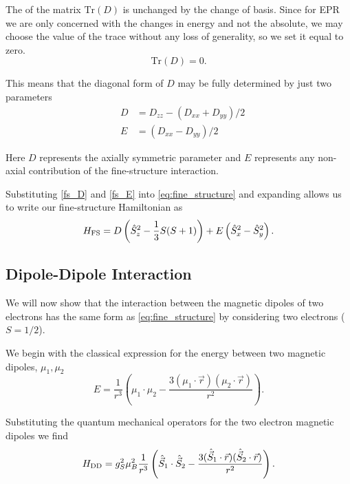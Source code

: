 The  of the matrix $\text{Tr}(D)$ is unchanged by the change of basis. Since for EPR we are only concerned with the changes in energy and not the absolute, we may choose the value of the trace without any loss of generality, so we set it equal to zero. 
\begin{equation}
    \text{Tr}(D) = 0. 
\end{equation}

This means that the diagonal form of $D$ may be fully determined by just two parameters 
\begin{eqnarray}
    &D &= D_{zz} - (D_{xx}+ D_{yy})/2 \label{fs_D}\\ 
    &E &= (D_{xx} - D_{yy})/2 \label{fs_E}
\end{eqnarray}

Here $D$ represents the axially symmetric parameter and $E$ represents any non-axial contribution of the fine-structure interaction. 

Substituting \eqref{fs_D} and \eqref{fs_E} into \eqref{eq:fine_structure} and expanding allows us to write our fine-structure Hamiltonian as
\begin{equation}
    H_{\ce{FS}} = D \left(\hat{S}_z^2 - \frac{1}{3}S(S+1)\right) + E\left(\hat{S}_x^2 - \hat{S}_y^2\right).
    \label{eq:fine_structure_hamiltonian}
\end{equation}

\subsection{Dipole-Dipole Interaction}
We will now show that the interaction between the magnetic dipoles of two electrons has the same form as \eqref{eq:fine_structure} by considering two electrons ($S=1/2$). 

We begin with the classical expression for the energy between two magnetic dipoles, $\mu_1, \mu_2$
\begin{equation}
    E = \frac{1}{r^3} \left(\mu_1 \cdot \mu_2 -\frac{3(\mu_1 \cdot \vec{r})(\mu_2 \cdot \vec{r})}{r^2}\right).
\end{equation}

Substituting the quantum mechanical operators for the two electron magnetic dipoles we find 
\begin{equation}
    H_{\ce{DD}} = g_S^2 \mu_B^2 \frac{1}{r^3} \left(\hat{\vec{S}}_1 \cdot \hat{\vec{S}}_2 -\frac{3(\hat{\vec{S}}_1 \cdot \vec{r})(\hat{\vec{S}}_2 \cdot \vec{r})}{r^2}\right).
\end{equation}

